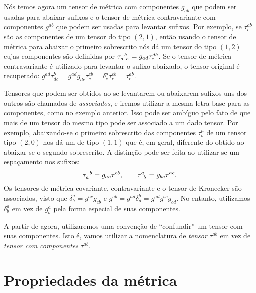 Nós temos agora um tensor de métrica com componentes $g_{ab}$ que podem ser usadas para abaixar sufixos e o tensor de métrica contravariante com componentes $g^{ab}$ que podem ser usadas para levantar sufixos. Por exemplo, se $\tau^{ab}_c$ são as componentes de um tensor do tipo $(2,1)$, então usando o tensor de métrica para abaixar o primeiro sobrescrito nós dá um tensor do tipo $(1,2)$ cujas componentes são definidas por $\tensor{\tau}{_a^b_c} = g_{ad}\tau^{db}_c$. Se o tensor de métrica contravariante é utilizado para levantar o sufixo abaixado, o tensor original é recuperado: $g^{a d} \tau_{d c}^{b}=g^{a d} g_{d e} \tau_{c}^{e b}=\delta_{e}^{a} \tau_{c}^{e b}=\tau_{c}^{a b}$.

Tensores que podem ser obtidos ao se levantarem ou abaixarem sufixos uns dos outros são chamados de \textit{associados}, e iremos utilizar a mesma letra base para as componentes, como no exemplo anterior. Isso pode ser ambíguo pelo fato de que mais de um tensor do mesmo tipo pode ser associado a um dado tensor. Por exemplo, abaixando-se o primeiro sobrescrito das componentes $\tau^a_b$ de um tensor tipo $(2,0)$ nos dá um de tipo $(1,1)$ que é, em geral, diferente do obtido ao abaixar-se o segundo sobrescrito. A distinção pode ser feita ao utilizar-se um espaçamento nos sufixos:
\[
	\tensor{\tau}{_a^b} = g_{ac}\tau^{cb}, \qquad \tensor{\tau}{^a_b}=g_{bc}\tau^{ac} .
\]
Os tensores de métrica covariante, contravariante e o tensor de Kronecker são associados, visto que $\delta_{b}^{a}=g^{a c} g_{c b}$ e $g^{a b}=g^{a d} \delta_{d}^{b}=g^{a d} g^{b c} g_{c d}$. No entanto, utilizamos $\delta^a_b$ em vez de $g^a_b$ pela forma especial de suas componentes.

A partir de agora, utilizaremos uma convenção de ``confundir'' um tensor com suas componentes. Isto é, vamos utilizar a nomenclatura de \textit{tensor} $\tau^{ab}$ em vez de \textit{tensor com componentes} $\tau^{ab}$.

\section{Propriedades da métrica}\label{sec:Metrica}

